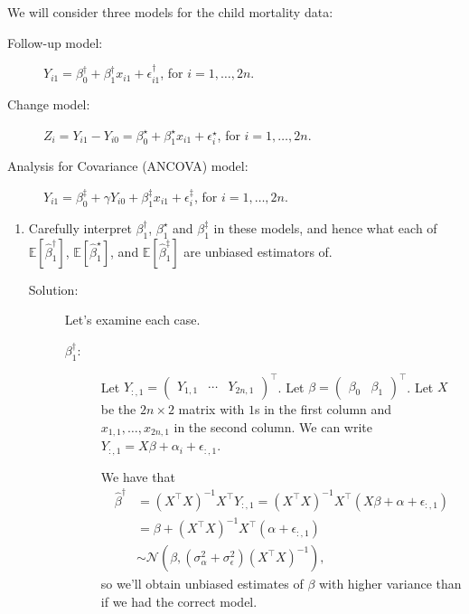 \documentclass[letterpaper,11pt]{article}
\begin{document}
\begin{enumerate}
  We will consider three models for the child mortality data:  
  \begin{description}
  \item[Follow-up model:]
    $Y_{i1} = \beta_0^\dagger + \beta_1^\dagger x_{i1} + \epsilon_{i1}^\dagger$,
    for $i = 1,\ldots,2n$.
  \item[Change model:]
    $Z_i = Y_{i1} - Y_{i0} = \beta_0^\star + \beta_1^\star x_{i1} +
    \epsilon_i^\star$, for $i = 1,\ldots,2n$.
  \item[Analysis for Covariance (ANCOVA) model:]
    $Y_{i1} = \beta_0^\ddagger + \gamma Y_{i0} + \beta_1^\ddagger x_{i1} +
    \epsilon_i^\ddagger$, for $i = 1,\ldots,2n$.
  \end{description}
  \begin{enumerate}
  \item Carefully interpret $\beta_1^\dagger$, $\beta_1^\star$ and
    $\beta_1^\ddagger$ in these models, and hence what each of
    $\mathbb{E}\left[\hat{\beta}^\dagger_1\right]$,
    $\mathbb{E}\left[\hat{\beta}^\star_1\right]$, and
    $\mathbb{E}\left[\hat{\beta}_1^\ddagger\right]$ are unbiased estimators of.
    \begin{description}
    \item[Solution:] Let's examine each case.
      \begin{description}
      \item[$\beta_1^\dagger$:] Let
        $Y_{:,1} = \begin{pmatrix} Y_{1,1} & \cdots & Y_{2n,1}
        \end{pmatrix}^\intercal$. Let
        $\beta = \begin{pmatrix} \beta_0 & \beta_1
        \end{pmatrix}^\intercal$. Let $X$ be the $2n \times 2$ matrix with $1$s
        in the first column and $x_{1,1},\ldots,x_{2n,1}$ in the second column.
        We can write $Y_{:,1} = X\beta + \alpha_i + \epsilon_{:,1}$.

        We have that
        \begin{align}
          \hat{\beta}^\dagger
          &= \left(X^\intercal X\right)^{-1}X^\intercal Y_{:,1}
            = \left(X^\intercal X\right)^{-1}X^\intercal\left(
            X\beta + \alpha + \epsilon_{:,1}
            \right)\nonumber\\
          &= \beta + \left(X^\intercal X\right)^{-1}X^\intercal\left(
            \alpha + \epsilon_{:,1}
            \right) \nonumber\\
          &\sim \mathcal{N}\left(\beta,
            \left(\sigma^2_\alpha + \sigma^2_\epsilon\right)\left(X^\intercal X\right)^{-1}
            \right),
            \label{eqn:p1_follow_estimator_dist}
        \end{align}
        so we'll obtain unbiased estimates of $\beta$ with higher variance than
        if we had the correct model.


\end{description}
\end{description}
\end{enumerate}
\end{enumerate}
\end{document}
